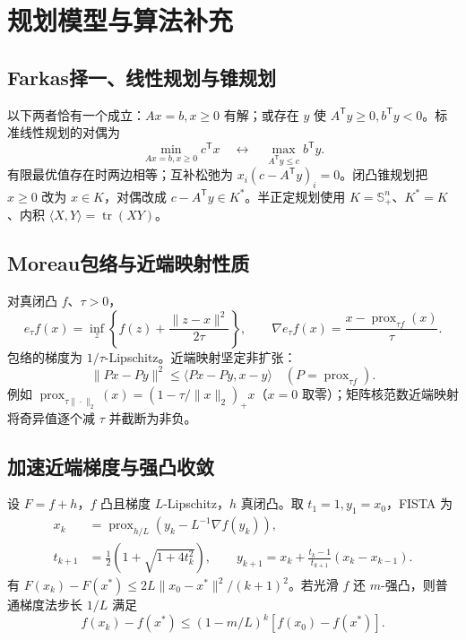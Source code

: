 \documentclass[../main.tex]{subfiles}
\begin{document}
\section{规划模型与算法补充}
\subsection{Farkas择一、线性规划与锥规划}
以下两者恰有一个成立：$Ax=b,x\ge0$ 有解；或存在 $y$ 使 $A^{\mathsf T}y\ge0,b^{\mathsf T}y<0$。标准线性规划的对偶为
\[
\min_{Ax=b,x\ge0}c^{\mathsf T}x
\quad\longleftrightarrow\quad
\max_{A^{\mathsf T}y\le c}b^{\mathsf T}y.
\]
有限最优值存在时两边相等；互补松弛为 $x_i(c-A^{\mathsf T}y)_i=0$。闭凸锥规划把 $x\ge0$ 改为 $x\in K$，对偶改成 $c-A^{\mathsf T}y\in K^*$。半正定规划使用 $K=\mathbb S_+^n$、$K^*=K$、内积 $\langle X,Y\rangle=\operatorname{tr}(XY)$。
\subsection{Moreau包络与近端映射性质}
对真闭凸 $f$、$\tau>0$，
\[
e_\tau f(x)=\inf_z\left\{f(z)+\frac{\|z-x\|^2}{2\tau}\right\},\qquad
\nabla e_\tau f(x)=\frac{x-\operatorname{prox}_{\tau f}(x)}\tau.
\]
包络的梯度为 $1/\tau$-Lipschitz。近端映射坚定非扩张：
\[
\|Px-Py\|^2\le\langle Px-Py,x-y\rangle\quad(P=\operatorname{prox}_{\tau f}).
\]
例如 $\operatorname{prox}_{\tau\|\cdot\|_2}(x)=(1-\tau/\|x\|_2)_+x$（$x=0$ 取零）；矩阵核范数近端映射将奇异值逐个减 $\tau$ 并截断为非负。
\subsection{加速近端梯度与强凸收敛}
设 $F=f+h$，$f$ 凸且梯度 $L$-Lipschitz，$h$ 真闭凸。取 $t_1=1,y_1=x_0$，FISTA 为
\begin{align*}
x_k&=\operatorname{prox}_{h/L}(y_k-L^{-1}\nabla f(y_k)),\\
t_{k+1}&=\tfrac12(1+\sqrt{1+4t_k^2}),\qquad
y_{k+1}=x_k+\frac{t_k-1}{t_{k+1}}(x_k-x_{k-1}).
\end{align*}
有 $F(x_k)-F(x^*)\le2L\|x_0-x^*\|^2/(k+1)^2$。若光滑 $f$ 还 $m$-强凸，则普通梯度法步长 $1/L$ 满足
\[
f(x_k)-f(x^*)\le(1-m/L)^k[f(x_0)-f(x^*)].
\]
\end{document}
